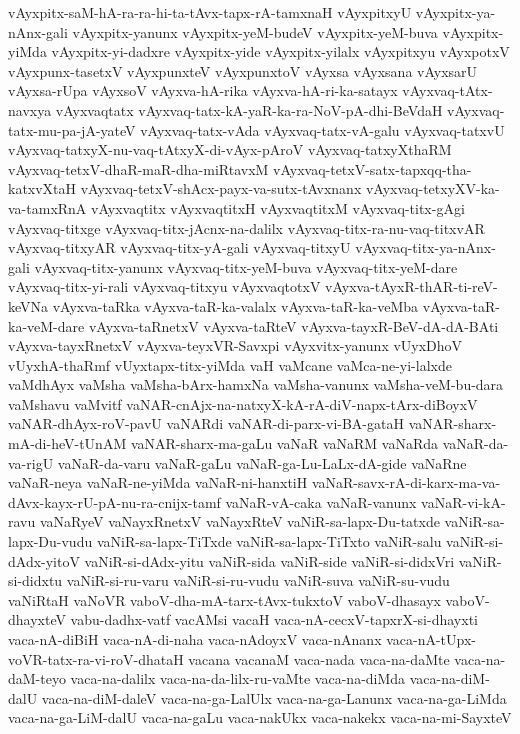 {vAyxpitx-saM-hA-ra-ra-hi-ta-tAvx-tapx-rA-tamxnaH
vAyxpitxyU
vAyxpitx-ya-nAnx-gali
vAyxpitx-yanunx
vAyxpitx-yeM-budeV
vAyxpitx-yeM-buva
vAyxpitx-yiMda
vAyxpitx-yi-dadxre
vAyxpitx-yide
vAyxpitx-yilalx
vAyxpitxyu
vAyxpotxV
vAyxpunx-tasetxV
vAyxpunxteV
vAyxpunxtoV
vAyxsa
vAyxsana
vAyxsarU
vAyxsa-rUpa
vAyxsoV
vAyxva-hA-rika
vAyxva-hA-ri-ka-satayx
vAyxvaq-tAtx-navxya
vAyxvaqtatx
vAyxvaq-tatx-kA-yaR-ka-ra-NoV-pA-dhi-BeVdaH
vAyxvaq-tatx-mu-pa-jA-yateV
vAyxvaq-tatx-vAda
vAyxvaq-tatx-vA-galu
vAyxvaq-tatxvU
vAyxvaq-tatxyX-nu-vaq-tAtxyX-di-vAyx-pAroV
vAyxvaq-tatxyXthaRM
vAyxvaq-tetxV-dhaR-maR-dha-miRtavxM
vAyxvaq-tetxV-satx-tapxqq-tha-katxvXtaH
vAyxvaq-tetxV-shAcx-payx-va-sutx-tAvxnanx
vAyxvaq-tetxyXV-ka-va-tamxRnA
vAyxvaqtitx
vAyxvaqtitxH
vAyxvaqtitxM
vAyxvaq-titx-gAgi
vAyxvaq-titxge
vAyxvaq-titx-jAcnx-na-dalilx
vAyxvaq-titx-ra-nu-vaq-titxvAR
vAyxvaq-titxyAR
vAyxvaq-titx-yA-gali
vAyxvaq-titxyU
vAyxvaq-titx-ya-nAnx-gali
vAyxvaq-titx-yanunx
vAyxvaq-titx-yeM-buva
vAyxvaq-titx-yeM-dare
vAyxvaq-titx-yi-rali
vAyxvaq-titxyu
vAyxvaqtotxV
vAyxva-tAyxR-thAR-ti-reV-keVNa
vAyxva-taRka
vAyxva-taR-ka-valalx
vAyxva-taR-ka-veMba
vAyxva-taR-ka-veM-dare
vAyxva-taRnetxV
vAyxva-taRteV
vAyxva-tayxR-BeV-dA-dA-BAti
vAyxva-tayxRnetxV
vAyxva-teyxVR-Savxpi
vAyxvitx-yanunx
vUyxDhoV
vUyxhA-thaRmf
vUyxtapx-titx-yiMda
vaH
vaMcane
vaMca-ne-yi-lalxde
vaMdhAyx
vaMsha
vaMsha-bArx-hamxNa
vaMsha-vanunx
vaMsha-veM-bu-dara
vaMshavu
vaMvitf
vaNAR-cnAjx-na-natxyX-kA-rA-diV-napx-tArx-diBoyxV
vaNAR-dhAyx-roV-pavU
vaNARdi
vaNAR-di-parx-vi-BA-gataH
vaNAR-sharx-mA-di-heV-tUnAM
vaNAR-sharx-ma-gaLu
vaNaR
vaNaRM
vaNaRda
vaNaR-da-va-rigU
vaNaR-da-varu
vaNaR-gaLu
vaNaR-ga-Lu-LaLx-dA-gide
vaNaRne
vaNaR-neya
vaNaR-ne-yiMda
vaNaR-ni-hanxtiH
vaNaR-savx-rA-di-karx-ma-va-dAvx-kayx-rU-pA-nu-ra-cnijx-tamf
vaNaR-vA-caka
vaNaR-vanunx
vaNaR-vi-kA-ravu
vaNaRyeV
vaNayxRnetxV
vaNayxRteV
vaNiR-sa-lapx-Du-tatxde
vaNiR-sa-lapx-Du-vudu
vaNiR-sa-lapx-TiTxde
vaNiR-sa-lapx-TiTxto
vaNiR-salu
vaNiR-si-dAdx-yitoV
vaNiR-si-dAdx-yitu
vaNiR-sida
vaNiR-side
vaNiR-si-didxVri
vaNiR-si-didxtu
vaNiR-si-ru-varu
vaNiR-si-ru-vudu
vaNiR-suva
vaNiR-su-vudu
vaNiRtaH
vaNoVR
vaboV-dha-mA-tarx-tAvx-tukxtoV
vaboV-dhasayx
vaboV-dhayxteV
vabu-dadhx-vatf
vacAMsi
vacaH
vaca-nA-cecxV-tapxrX-si-dhayxti
vaca-nA-diBiH
vaca-nA-di-naha
vaca-nAdoyxV
vaca-nAnanx
vaca-nA-tUpx-voVR-tatx-ra-vi-roV-dhataH
vacana
vacanaM
vaca-nada
vaca-na-daMte
vaca-na-daM-teyo
vaca-na-dalilx
vaca-na-da-lilx-ru-vaMte
vaca-na-diMda
vaca-na-diM-dalU
vaca-na-diM-daleV
vaca-na-ga-LalUlx
vaca-na-ga-Lanunx
vaca-na-ga-LiMda
vaca-na-ga-LiM-dalU
vaca-na-gaLu
vaca-nakUkx
vaca-nakekx
vaca-na-mi-SayxteV
}
